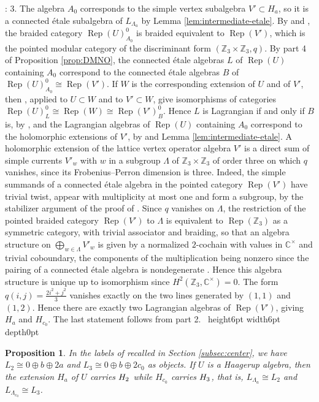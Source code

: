 \documentclass[leqno]{article}
\newcommand{\Cbb}{\ensuremath{\mathbb{C}}}
\let\cal\relax
\newcommand{\cal}{\mathcal}
\newcommand{\Z}{\ensuremath{\mathbb{Z}}}
\newcommand{\qed}{\hfill \vrule height6pt  width6pt depth0pt}
\DeclareMathOperator{\Rep}{Rep} %
\newtheorem{prop}[thm]{Proposition}
\newenvironment{proof}[1][]{\noindent {\it Proof #1} : }{\hbox{~}\qed
\smallskip
}
\numberwithin{equation}{section}
\begin{document}
\begin{proof}
3. The algebra $A_0$ corresponds to the simple vertex subalgebra $V' \subset H_a$, so it is a connected \'etale subalgebra of $L_{\Lambda_a}$ by Lemma \ref{lem:intermediate-etale}. By \cite[Theorem 3.4 p.~16]{HKL15} and \cite[Theorem 3.65 p.~85]{CKM24}, the braided category $\Rep(U)_{A_0}^0$ is braided equivalent to $\Rep(V')$, which is the pointed modular category of the discriminant form $(\Z_3 \times \Z_3,q)$. By part 4 of Proposition \ref{prop:DMNO}, the connected \'etale algebras $L$ of $\Rep(U)$ containing $A_0$ correspond to the connected \'etale algebras $B$ of $\Rep(U)^0_{A_0} \cong \Rep(V')$. If $W$ is the corresponding extension of $U$ and of $V'$, then \cite[Theorems 3.2 and 3.4 pp.~10 and 16]{HKL15}, applied to $U \subset W$ and to $V' \subset W$, give isomorphisms of categories $\Rep(U)^0_L \cong \Rep(W) \cong \Rep(V')^0_B$. Hence $L$ is Lagrangian if and only if $B$ is, by \cite[Remark 4.3 p.~16]{DMNO13}, and the Lagrangian algebras of $\Rep(U)$ containing $A_0$ correspond to the holomorphic extensions of $V'$, by \cite[Theorems 3.2 and 3.4 pp.~10 and 16]{HKL15} and Lemma \ref{lem:intermediate-etale}. A holomorphic extension of the lattice vertex operator algebra $V'$ is a direct sum of simple currents $V'_w$ with $w$ in a subgroup $\Lambda$ of $\Z_3 \times \Z_3$ of order three on which $q$ vanishes, since its Frobenius--Perron dimension is three. Indeed, the simple summands of a connected \'etale algebra in the pointed category $\Rep(V')$ have trivial twist, appear with multiplicity at most one and form a subgroup, by the stabilizer argument of the proof of \cite[Proposition 4.1]{Arh26}. Since $q$ vanishes on $\Lambda$, the restriction of the pointed braided category $\Rep(V')$ to $\Lambda$ is equivalent to $\Rep(\Z_3)$ as a symmetric category, with trivial associator and braiding, so that an algebra structure on $\bigoplus_{w \in \Lambda}V'_w$ is given by a normalized $2$-cochain with values in $\Cbb^\times$ and trivial coboundary, the components of the multiplication being nonzero since the pairing of a connected \'etale algebra is nondegenerate \cite[Remark 3.4 p.~7]{DMNO13}. Hence this algebra structure is unique up to isomorphism since $H^2(\Z_3,\Cbb^\times) = 0$. The form $q(i,j) = \frac{2i^2+j^2}{3}$ vanishes exactly on the two lines generated by $(1,1)$ and $(1,2)$. Hence there are exactly two Lagrangian algebras of $\Rep(V')$, giving $H_a$ and $H_{c_0}$. The last statement follows from part 2.
\end{proof}

\begin{prop}
\label{prop:which-line}
In the labels of \cite{EvG11} recalled in Section \ref{subsec:center}, we have $L_2 \cong 0 \oplus b \oplus 2a$ and $L_3 \cong 0 \oplus b \oplus 2c_0$ as objects. If $U$ is a Haagerup algebra, then the extension $H_a$ of $U$ carries $\cal H_2$ while $H_{c_0}$ carries $\cal H_3$, that is, $L_{\Lambda_a} \cong L_2$ and $L_{\Lambda_{c_0}} \cong L_3$.
\end{prop}
\end{document}
